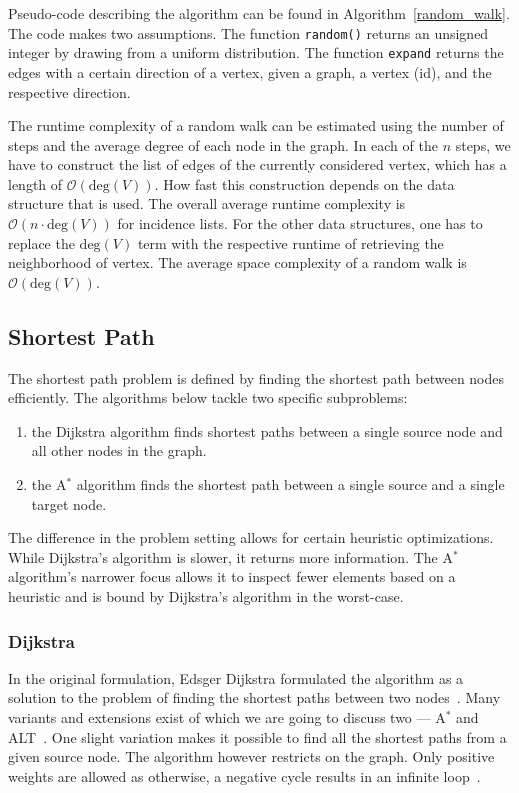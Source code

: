                 Pseudo-code describing the algorithm can be found in Algorithm~\ref{random_walk}. 
                The code makes two assumptions. The function \texttt{random()} returns an unsigned integer by drawing from a uniform distribution. 
                The function \texttt{expand} returns the edges with a certain direction of a vertex, given a graph, a vertex (id), and the respective direction.
                
                The runtime complexity of a random walk can be estimated using the number of steps and the average degree of each node in the graph. 
                In each of the $n$ steps, we have to construct the list of edges of the currently considered vertex, which has a length of $\mathcal{O}(\text{deg}(V))$. 
                How fast this construction depends on the data structure that is used. 
                The overall average runtime complexity is $\mathcal{O}(n \cdot \text{deg}(V))$ for incidence lists. 
                For the other data structures, one has to replace the $\text{deg}(V)$ term with the respective runtime of retrieving the neighborhood of vertex. 
                The average space complexity of a random walk is $\mathcal{O}(\text{deg}(V))$.
        
    \subsection{Shortest Path}
        The shortest path problem is defined by finding the shortest path between nodes efficiently.
        The algorithms below tackle two specific subproblems:
        \begin{enumerate}
         \item the Dijkstra algorithm finds shortest paths between a single source node and all other nodes in the graph.
         \item the A$^*$ algorithm finds the shortest path between a single source and a single target node.
        \end{enumerate}
        The difference in the problem setting allows for certain heuristic optimizations. 
        While Dijkstra's algorithm is slower, it returns more information.
        The A$^*$ algorithm's narrower focus allows it to inspect fewer elements based on a heuristic and is bound by Dijkstra's algorithm in the worst-case.

        \subsubsection*{Dijkstra} 
            In the original formulation, Edsger Dijkstra formulated the algorithm as a solution to the problem of finding the shortest paths between two nodes~\autocite{dijkstra1959note}. 
            Many variants and extensions exist of which we are going to discuss two --- A$^*$ and ALT~\autocite{hart1968formal, goldberg2005computing}. 
            One slight variation makes it possible to find all the shortest paths from a given source node.
            The algorithm however restricts on the graph.
            Only positive weights are allowed as otherwise, a negative cycle results in an infinite loop~\autocite{cormen2009introduction}. 
            
